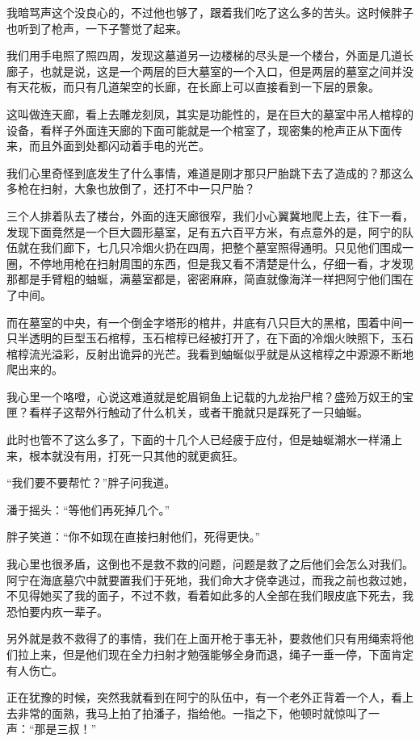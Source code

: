 我暗骂声这个没良心的，不过他也够了，跟着我们吃了这么多的苦头。这时候胖子也听到了枪声，一下子警觉了起来。

我们用手电照了照四周，发现这墓道另一边楼梯的尽头是一个楼台，外面是几道长廊子，也就是说，这是一个两层的巨大墓室的一个入口，但是两层的墓室之间并没有天花板，而只有几道架空的长廊，在长廊上可以直接看到一下层的景象。

这叫做连天廊，看上去雕龙刻凤，其实是功能性的，是在巨大的墓室中吊人棺椁的设备，看样子外面连天廊的下面可能就是一个棺室了，现密集的枪声正从下面传来，而且外面到处都闪动着手电的光芒。

我们心里奇怪到底发生了什么事情，难道是刚才那只尸胎跳下去了造成的？那这么多枪在扫射，大象也放倒了，还打不中一只尸胎？

三个人排着队去了楼台，外面的连天廊很窄，我们小心翼冀地爬上去，往下一看，发现下面竟然是一个巨大圆形墓室，足有五六百平方米，有点意外的是，阿宁的队伍就在我们廊下，七几只冷烟火扔在四周，把整个墓室照得通明。只见他们围成一圈，不停地用枪在扫射周围的东西，但是我又看不清楚是什么，仔细一看，才发现那都是手臂粗的蚰蜒，满墓室都是，密密麻麻，简直就像海洋一样把阿宁他们围在了中间。

而在墓室的中央，有一个倒金字塔形的棺井，井底有八只巨大的黑棺，围着中间一只半透明的巨型玉石棺椁，玉石棺椁已经被打开了，在下面的冷烟火映照下，玉石棺椁流光溢彩，反射出诡异的光芒。我看到蚰蜒似乎就是从这棺椁之中源源不断地爬出来的。

我心里一个咯噔，心说这难道就是蛇眉铜鱼上记载的九龙抬尸棺？盛殓万奴王的宝匣？看样子这帮外行触动了什么机关，或者干脆就只是踩死了一只蚰蜒。

此时也管不了这么多了，下面的十几个人已经疲于应付，但是蚰蜒潮水一样涌上来，根本就没有用，打死一只其他的就更疯狂。

“我们要不要帮忙？”胖子问我道。

潘于摇头：“等他们再死掉几个。”

胖子笑道：“你不如现在直接扫射他们，死得更快。”

我心里也很矛盾，这倒也不是救不救的问题，问题是救了之后他们会怎么对我们。阿宁在海底墓穴中就要置我们于死地，我们命大才侥幸逃过，而我之前也救过她，不见得她买了我的面子，不过不救，看着如此多的人全部在我们眼皮底下死去，我恐怕要内疚一辈子。

另外就是救不救得了的事情，我们在上面开枪于事无补，要救他们只有用绳索将他们拉上来，但是他们现在全力扫射才勉强能够全身而退，绳子一垂一停，下面肯定有人伤亡。

正在犹豫的时候，突然我就看到在阿宁的队伍中，有一个老外正背着一个人，看上去非常的面熟，我马上拍了拍潘子，指给他。一指之下，他顿时就惊叫了一声：“那是三叔！”

